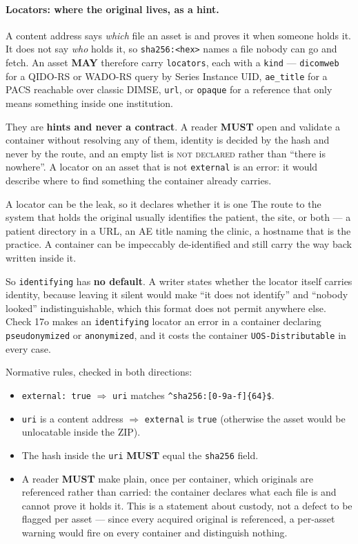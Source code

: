 \documentclass[11pt,a4paper]{article}
\newcommand{\MUST}{\textcolor{uosred}{\textbf{MUST}}}
\newcommand{\MAY}{\textcolor{uosgreen}{\textbf{MAY}}}
\newcommand{\code}[1]{\texttt{\small #1}}
\begin{document}
\paragraph{Locators: where the original lives, as a hint.} A content address says
\emph{which} file an asset is and proves it when someone holds it. It does not say
\emph{who} holds it, so \code{sha256:<hex>} names a file nobody can go and fetch. An asset
\MAY{} therefore carry \code{locators}, each with a \code{kind} --- \code{dicomweb} for a
QIDO-RS or WADO-RS query by Series Instance UID, \code{ae\_title} for a PACS reachable over
classic DIMSE, \code{url}, or \code{opaque} for a reference that only means something
inside one institution.

They are \textbf{hints and never a contract}. A reader \MUST{} open and validate a
container without resolving any of them, identity is decided by the hash and never by the
route, and an empty list is \textsc{not declared} rather than ``there is nowhere''. A
locator on an asset that is not \code{external} is an error: it would describe where to
find something the container already carries.

\begin{finding}{A locator can be the leak, so it declares whether it is one}
The route to the system that holds the original usually identifies the patient, the site,
or both --- a patient directory in a URL, an AE title naming the clinic, a hostname that is
the practice. A container can be impeccably de-identified and still carry the way back
written inside it.

So \code{identifying} has \textbf{no default}. A writer states whether the locator itself
carries identity, because leaving it silent would make ``it does not identify'' and ``nobody
looked'' indistinguishable, which this format does not permit anywhere else. Check 17o
makes an \code{identifying} locator an error in a container declaring \code{pseudonymized}
or \code{anonymized}, and it costs the container \code{UOS-Distributable} in every case.
\end{finding}

Normative rules, checked in both directions:
\begin{itemize}
  \item \code{external: true} $\Rightarrow$ \code{uri} matches \code{\^{}sha256:[0-9a-f]\{64\}\$}.
  \item \code{uri} is a content address $\Rightarrow$ \code{external} is \code{true}
  (otherwise the asset would be unlocatable inside the ZIP).
  \item The hash inside the \code{uri} \MUST{} equal the \code{sha256} field.
  \item A reader \MUST{} make plain, once per container, which originals are referenced
  rather than carried: the container declares what each file is and cannot prove it holds
  it. This is a statement about custody, not a defect to be flagged per asset --- since
  every acquired original is referenced, a per-asset warning would fire on every container
  and distinguish nothing.
\end{itemize}
\end{document}

